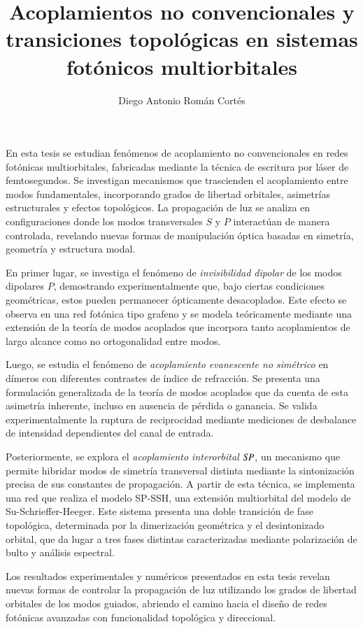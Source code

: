 \documentclass[hyphens]{umemoria}
\author{Diego Antonio Román Cortés}
\title{Acoplamientos no convencionales y transiciones topológicas en sistemas fotónicos multiorbitales}
\begin{document}
\frontmatter
\maketitle

\begin{resumen}\ignorespacesafterend
	En esta tesis se estudian fenómenos de acoplamiento no convencionales en redes fotónicas multiorbitales, fabricadas mediante la técnica de escritura por láser de femtosegundos. Se investigan mecanismos que trascienden el acoplamiento entre modos fundamentales, incorporando grados de libertad orbitales, asimetrías estructurales y efectos topológicos. La propagación de luz se analiza en configuraciones donde los modos transversales \( S \) y \( P \) interactúan de manera controlada, revelando nuevas formas de manipulación óptica basadas en simetría, geometría y estructura modal.
	
	En primer lugar, se investiga el fenómeno de \textit{invisibilidad dipolar} de los modos dipolares \( P \), demostrando experimentalmente que, bajo ciertas condiciones geométricas, estos pueden permanecer ópticamente desacoplados. Este efecto se observa en una red fotónica tipo grafeno  y se modela teóricamente mediante una extensión de la teoría de modos acoplados que incorpora tanto acoplamientos de largo alcance como no ortogonalidad entre modos.
	
	Luego, se estudia el fenómeno de \textit{acoplamiento evanescente no simétrico} en dímeros con diferentes contrastes de índice de refracción. Se presenta una formulación generalizada de la teoría de modos acoplados que da cuenta de esta asimetría inherente, incluso en ausencia de pérdida o ganancia. Se valida experimentalmente la ruptura de reciprocidad mediante mediciones de desbalance de intensidad dependientes del canal de entrada.
	
	Posteriormente, se explora el \textit{acoplamiento interorbital \( S\hspace{-0.3ex}P \)}, un mecanismo que permite hibridar modos de simetría transversal distinta mediante la sintonización precisa de sus constantes de propagación. A partir de esta técnica, se implementa una red que realiza el modelo SP-SSH, una extensión multiorbital del modelo de Su-Schrieffer-Heeger. Este sistema presenta una doble transición de fase topológica, determinada por la dimerización geométrica y el desintonizado orbital, que da lugar a tres fases distintas caracterizadas mediante polarización de bulto y análisis espectral.
	
	Los resultados experimentales y numéricos presentados en esta tesis revelan nuevas formas de controlar la propagación de luz utilizando los grados de libertad orbitales de los modos guiados, abriendo el camino hacia el diseño de redes fotónicas avanzadas con funcionalidad topológica y direccional.
\end{resumen}
\end{document}

